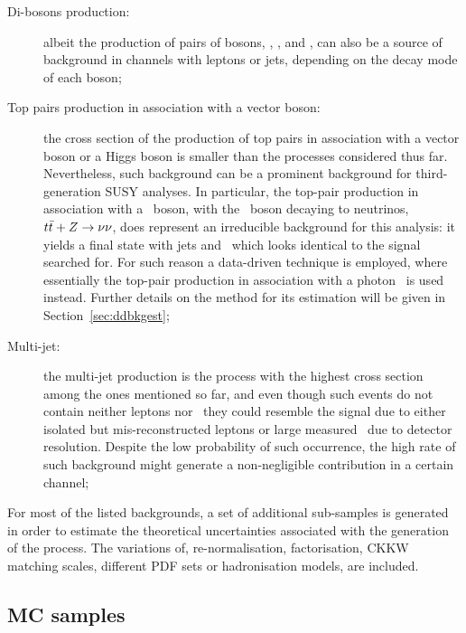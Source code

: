 \begin{description}
			\item [Di-bosons production:] albeit the production of pairs of bosons, \Wboson\Wboson, \Wboson\Zboson, and \Zboson\Zboson, can also be a source of background in channels with leptons or jets, depending on the decay mode of each boson;

			\item [Top pairs production in association with a vector boson:] the cross section of the production of top pairs in association with a vector boson or a Higgs boson is smaller than the processes considered thus far. Nevertheless, such background can be a prominent background for third-generation \ac{SUSY} analyses. In particular, the top-pair production in association with a \Zboson\ boson, with the \Zboson\ boson decaying to neutrinos, $t\bar{t}+Z \rightarrow \nu \nu$, does represent an irreducible background for this analysis: it yields a final state with jets and \met\ which looks identical to the signal searched for. For such reason a data-driven technique is employed, where essentially the top-pair production in association with a photon \ttgamma\ is used instead. Further details on the method for its estimation will be given in Section~\ref{sec:ddbkgest}; 

			\item [Multi-jet:] the multi-jet production is the process with the highest cross section among the ones mentioned so far, and even though such events do not contain neither leptons nor \met\ they could resemble the signal due to either isolated but mis-reconstructed leptons or large measured \met\ due to detector resolution. Despite the low probability of such occurrence, the high rate of such background might generate a non-negligible contribution in a certain channel;
		\end{description}

		\noindent For most of the listed backgrounds, a set of additional sub-samples is generated in order to estimate the theoretical uncertainties associated with the generation of the process. The variations of, re-normalisation, factorisation, \ac{CKKW} matching scales, different \ac{PDF} sets or hadronisation models, are included.

		\subsection{MC samples}


